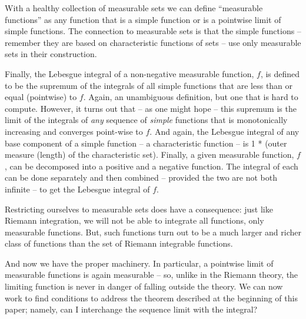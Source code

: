 \documentclass{article}
\begin{document}
With a healthy collection of measurable sets we can define ``measurable functions''
as any function that is a simple function or is a pointwise limit of simple functions.
The connection to measurable sets is that the simple functions -- remember they 
are based on characteristic functions of sets -- use only measurable sets in 
their construction.

Finally, the Lebesgue integral of a non-negative measurable function, $f$, is defined to be 
the supremum of the integrals of
all simple functions that are less than or equal (pointwise) to $f$. 
Again, an unambiguous definition, but one that is hard to compute. 
However, it turns out that -- as one might hope --
this supremum is the limit of the integrals of {\em any\/} sequence of
{\em simple\/} functions that is monotonically increasing and converges
point-wise to $f$.
And again, the Lebesgue
integral of any base component of a simple function -- a characteristic function --
is 1 * (outer measure (length) of the characteristic set).
Finally, a given measurable function, $f$, can be decomposed into a positive and
a negative function. The integral of each can be done separately and then combined
-- provided the two are not both infinite -- to get the Lebesgue integral of $f$.

Restricting ourselves to measurable sets does have a consequence: just like 
Riemann integration, we will not be able to integrate all functions, only 
measurable functions. But, such functions turn out to be a 
much larger and richer class of functions than the set of Riemann integrable functions.

And now we have the proper machinery.  In particular, a pointwise limit of
measurable functions is again measurable -- so, unlike in the Riemann
theory, the limiting function is never in danger of falling outside the
theory.  We can now work to find conditions
to address the theorem described at the beginning of this paper; namely,
can I interchange the sequence limit with the integral?
\end{document}
